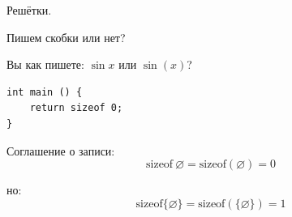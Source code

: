 \documentclass[aspectratio=169]{beamer}
\begin{document}

\begin{frame}
\begin{center}\Large Решётки.\end{center}
\end{frame}

\begin{frame}[fragile]{Пишем скобки или нет?}

Вы как пишете: $\sin x$ или $\sin (x)$? \pause

\begin{verbatim}
int main () {
    return sizeof 0;
}
\end{verbatim}
\pause

Соглашение о записи:
$$\text{sizeof}\ \varnothing = \text{sizeof}(\varnothing) = 0$$

но:
   $$\text{sizeof}\{\varnothing\} = \text{sizeof}(\{\varnothing\}) = 1$$

\end{frame}
\end{document}
